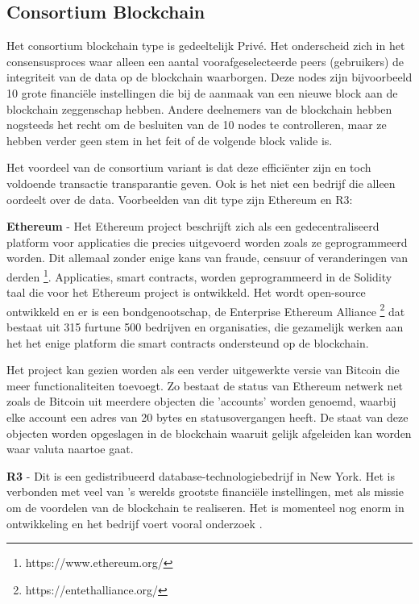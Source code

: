 \subsection{Consortium Blockchain}
Het consortium blockchain type is gedeeltelijk Privé. Het onderscheid zich in het consensusproces waar alleen een aantal voorafgeselecteerde peers (gebruikers) de integriteit van de data op de blockchain waarborgen. Deze nodes zijn bijvoorbeeld 10 grote financiële instellingen die bij de aanmaak van een nieuwe block aan de blockchain zeggenschap hebben. Andere deelnemers van de blockchain hebben nogsteeds het recht om de besluiten van de 10 nodes te controlleren, maar ze hebben verder geen stem in het feit of de volgende block valide is.\par

Het voordeel van de consortium variant is dat deze efficiënter zijn en toch voldoende transactie transparantie geven. Ook is het niet een bedrijf die alleen oordeelt over de data. Voorbeelden van dit type zijn Ethereum en R3:

\textbf{Ethereum} - Het Ethereum project beschrijft zich als een gedecentraliseerd platform voor applicaties die precies uitgevoerd worden zoals ze geprogrammeerd worden. Dit allemaal zonder enige kans van fraude, censuur of veranderingen van derden \footnote{https://www.ethereum.org/}. Applicaties, smart contracts, worden geprogrammeerd in de Solidity taal die voor het Ethereum project is ontwikkeld. Het wordt open-source ontwikkeld en er is een bondgenootschap, de Enterprise Ethereum Alliance \footnote{https://entethalliance.org/} dat bestaat uit 315 furtune 500 bedrijven en organisaties, die gezamelijk werken aan het het enige platform die smart contracts ondersteund op de blockchain.\cite{ethWood}\par

Het project kan gezien worden als een verder uitgewerkte versie van Bitcoin die meer functionaliteiten toevoegt. Zo bestaat de status van Ethereum netwerk net zoals de Bitcoin uit meerdere objecten die 'accounts' worden genoemd, waarbij elke account een adres van 20 bytes en statusovergangen heeft. De staat van deze objecten worden opgeslagen in de blockchain waaruit gelijk afgeleiden kan worden waar valuta naartoe gaat.\cite{whitePaperEthereum}

\textbf{R3} - Dit is een gedistribueerd database-technologiebedrijf in New York. Het is verbonden met veel van 's werelds grootste financiële instellingen, met als missie om de voordelen van de blockchain te realiseren. Het is momenteel nog enorm in ontwikkeling en het bedrijf voert vooral onderzoek \cite{R3}.

